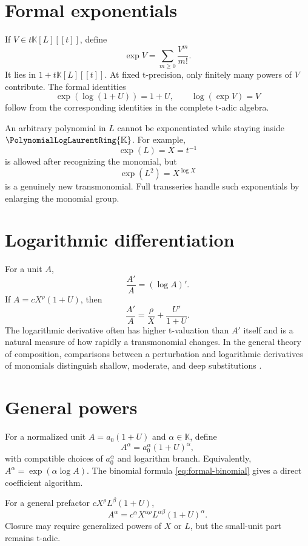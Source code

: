 \documentclass[11pt,openany]{book}
\theoremstyle{definition}
\theoremstyle{plain}
\theoremstyle{remark}
\newcommand{\K}{\mathbb{K}}
\begin{document}
\section{Formal exponentials}
If \(V\in t\K[L][[t]]\), define
\begin{equation}\label{eq:formal-exp-small}
 \exp V=\sum_{m\ge0}\frac{V^m}{m!}.
\end{equation}
It lies in \(1+t\K[L][[t]]\).  At fixed t-precision, only finitely many powers
of \(V\) contribute.  The formal identities
\[
 \exp(\log(1+U))=1+U,
 \qquad
 \log(\exp V)=V
\]
follow from the corresponding identities in the complete t-adic algebra.

An arbitrary polynomial in \(L\) cannot be exponentiated while staying inside
\(\PolynomialLogLaurentRing{\K}\).  For example,
\[
 \exp(L)=X=t^{-1}
\]
is allowed after recognizing the monomial, but
\[
 \exp(L^2)=X^{\log X}
\]
is a genuinely new transmonomial.  Full transseries handle such exponentials
by enlarging the monomial group.

\section{Logarithmic differentiation}
For a unit \(A\),
\begin{equation}\label{eq:logderivative}
 \frac{A'}A=(\log A)'.
\end{equation}
If \(A=cX^\rho(1+U)\), then
\[
 \frac{A'}A=\frac\rho X+\frac{U'}{1+U}.
\]
The logarithmic derivative often has higher t-valuation than \(A'\) itself and
is a natural measure of how rapidly a transmonomial changes.  In the general
theory of composition, comparisons between a perturbation and logarithmic
derivatives of monomials distinguish shallow, moderate, and deep substitutions
\cite{edgar-composition}.

\section{General powers}
For a normalized unit \(A=a_0(1+U)\) and \(\alpha\in\K\), define
\begin{equation}\label{eq:general-power}
 A^\alpha=a_0^\alpha(1+U)^\alpha,
\end{equation}
with compatible choices of \(a_0^\alpha\) and logarithm branch.  Equivalently,
\(A^\alpha=\exp(\alpha\log A)\).  The binomial formula
\cref{eq:formal-binomial} gives a direct coefficient algorithm.

For a general prefactor \(cX^\rho L^\beta(1+U)\),
\[
 A^\alpha=c^\alpha X^{\alpha\rho}L^{\alpha\beta}(1+U)^\alpha.
\]
Closure may require generalized powers of \(X\) or \(L\), but the small-unit
part remains t-adic.
\end{document}
